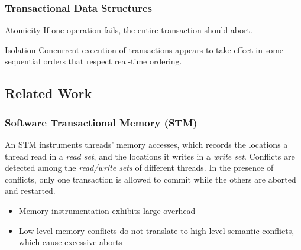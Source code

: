 \documentclass{beamer}
\begin{document}
\begin{frame} \frametitle{Transactional Data Structures}
            \begin{block}{Atomicity}
                If one operation fails, the entire transaction should abort.
            \end{block}
            \begin{block}{Isolation} 
                Concurrent execution of transactions appears to take effect in some sequential orders that respect real-time ordering.
            \end{block}
\end{frame}

\subsection{Related Work}
\begin{frame} \frametitle{Software Transactional Memory (STM)}
    \begin{block}{}
        \small
        An STM instruments threads' memory accesses, which records the locations a thread read in a \emph{read set}, and the locations it writes in a \emph{write set}. Conflicts are detected among the \emph{read/write sets} of different threads. In the presence of conflicts, only one transaction is allowed to commit while the others are aborted and restarted.
    \end{block}
    \begin{itemize}
        \item<1-> Memory instrumentation exhibits large overhead
        \item<2> Low-level memory conflicts do not translate to high-level semantic conflicts, which cause excessive aborts
    \end{itemize}
\begin{overlayarea}{\textwidth}{.40\textheight}
        \centering
\end{overlayarea}
\end{frame}
\end{document}
